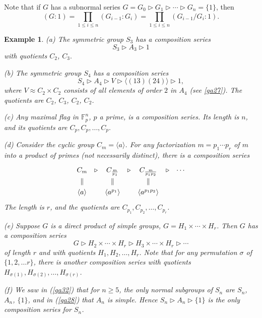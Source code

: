 \documentclass[a4paper,11pt,final]{memoir}%
\newtheorem{example}[X]{Example}
\theoremstyle{nonumberplain}
\begin{document}
Note that if $G$ has a subnormal series $G=G_{0}\triangleright G_{1}%
\triangleright\cdots\triangleright G_{n}=\{1\}$, then
\[
(G:1)=\prod_{1\leq i\leq n}(G_{i-1}:G_{i})=\prod_{1\leq i\leq n}(G_{i-1}%
/G_{i}:1).
\]


\begin{example}
\label{ns01}(a) The symmetric group $S_{3}$ has a composition series
\[
S_{3}\triangleright A_{3}\triangleright1
\]
with quotients $C_{2}$, $C_{3}.$

(b) The symmetric group $S_{4}$ has a composition series
\[
S_{4}\triangleright A_{4}\triangleright V\triangleright\langle(13)(24)\rangle
\triangleright1,
\]
where $V\approx C_{2}\times C_{2}$ consists of all elements of order $2$ in
$A_{4}$ (see \ref{ga27}). The quotients are $C_{2}$, $C_{3}$, $C_{2}$, $C_{2}$.

(c) Any maximal flag in $\mathbb{F}_{p}^{n}$, $p$ a prime, is a composition
series. Its length is $n$, and its quotients are $C_{p},C_{p},\ldots,C_{p}.$

(d) Consider the cyclic group $C_{m}=\langle a\rangle$. For any factorization
$m=p_{1}\cdots p_{r}$ of $m$ into a product of primes (not necessarily
distinct), there is a composition series
\[
\renewcommand{\arraystretch}{1.3}
\begin{array}
[c]{ccccccc}%
C_{m} & \triangleright & C_{\frac{m}{p_{1}}} & \triangleright & C_{\frac
{m}{p_{1}p_{2}}} & \triangleright & \cdots\\
\Vert &  & \Vert &  & \Vert &  & \\
\langle a\rangle &  & \langle a^{p_{1}}\rangle &  & \langle a^{p_{1}p_{2}%
}\rangle &  &
\end{array}
\]
The length is $r$, and the quotients are $C_{p_{1}},C_{p_{2}},\ldots,C_{p_{r}%
}$.

(e) Suppose $G$ is a direct product of simple groups, $G=H_{1}\times
\cdots\times H_{r}$. Then $G$ has a composition series
\[
G\triangleright H_{2}\times\cdots\times H_{r}\triangleright H_{3}\times
\cdots\times H_{r}\triangleright\cdots
\]
of length $r$ and with quotients $H_{1},H_{2},\ldots,H_{r}$. Note that for any
permutation $\sigma$ of $\{1,2,\ldots r\}$, there is another composition
series with quotients $H_{\sigma(1)},H_{\sigma(2)},\ldots,H_{\sigma(r)}$.

(f) We saw in (\ref{ga32}) that for $n\geq5$, the only normal subgroups of
$S_{n}$ are $S_{n}$, $A_{n}$, $\{1\}$, and in (\ref{ga28}) that $A_{n}$ is
simple. Hence $S_{n}\triangleright A_{n}\triangleright\{1\}$ is the
\textit{only}\emph{\/} composition series for $S_{n}$.
\end{example}
\end{document}
